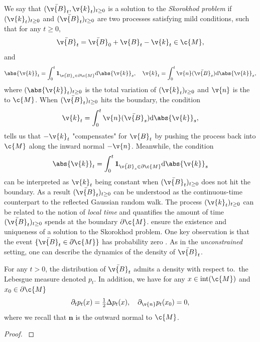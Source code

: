 We say that \((\bar{ \v{B}}_t, \v{k}_t)_{t \geq 0}\) is a solution to the \emph{Skorokhod problem} \parencite{skorokhod1961stochastic} if \(( \v{k}_t)_{t \geq 0}\) and \((\bar{ \v{B}}_t)_{t \geq 0}\) are two processes satisfying mild conditions, such that for any \(t \geq 0\), \begin{equation} \label{eq:rbm} \bar{ \v{B}}_t = \bar{ \v{B}}_0 + \v{B}_t - \v{k}_t \in \c{M}, \end{equation} and \[{\abs{ \v{k}}_t = \int_0^t \mathbf{1}_{\bar{ \v{B}}_s \in \partial \c{M}} \mathrm{d} \abs{\v{k}}_s}, \quad { \v{k}_t = \int_0^t \v{n}(\bar{ \v{B}}_s) \mathrm{d} \abs{\v{k}}_s ,}\] where \((\abs{ \v{k}}_t)_{t \geq 0}\) is the total variation of \(( \v{k}_t)_{t \geq 0}\) and \( \v{n}\) is the  to \(\c{M}\).
When \((\bar{ \v{B}}_t)_{t \geq 0}\) hits the boundary, the condition \[{ \v{k}_t = \int_0^t \v{n}(\bar{ \v{B}}_s) \mathrm{d} \abs{\v{k}}_s ,}\] tells us that \(- \v{k}_t\) "compensates" for \({ \v{B}}_t\) by pushing the process back into \(\c{M}\) along the inward normal \(- \v{n}\).
Meanwhile, the condition \[{\abs{\v{k}}_t = \int_0^t \mathbf{1}_{\bar{ \v{B}}_s \in \partial \c{M}} \mathrm{d} \abs{\v{k}}_s}\] can be interpreted as \( \v{k}_t\) being constant when \((\bar{ \v{B}}_t)_{t \geq 0}\) does not hit the boundary.
As a result \((\bar{ \v{B}}_t)_{t \geq 0}\) can be understood as the continuous-time counterpart to the reflected Gaussian random walk.
The process \(( \v{k}_t)_{t \geq 0}\) can be related to the notion of \emph{local time} \parencite{revuz2013continuous} and quantifies the amount of time \((\bar{ \v{B}}_t)_{t \geq 0}\) spends at the boundary \(\partial \c{M}\).
\textcite[Theorem
	2.1]{lions1984stochastic} ensure the existence and uniqueness of a solution to
the Skorokhod problem.
One key observation is that the event \(\{ \bar{ \v{B}}_t \in \partial \c{M} \}\) has probability zero \parencite[Section 7, Lemma 7]{harrison1987brownian}.
As in the \emph{unconstrained} setting, one can describe the dynamics of the density of \(\bar{ \v{B}}_t\).
\begin{proposition}
	For any \(t > 0\), the distribution of \(\bar{ \v{B}}_t\) admits a density with respect to.\
	the Lebesgue measure denoted \(p_t\).
	In addition, we have for any \(x \in \mathrm{int}(\c{M})\) and \(x_0 \in \partial \c{M}\) \begin{equation} \label{eq:heat_eq_rbm} \partial_t p_t(x) = \tfrac{1}{2} \Delta p_t(x) , \quad \partial_{ \v{n}} p_t(x_0) = 0 , \end{equation} where we recall that \(\mathbf{n}\) is the outward normal to \(\c{M}\).
\end{proposition}
\begin{proof}
	\textcite{burdzy2004heat}
\end{proof}


